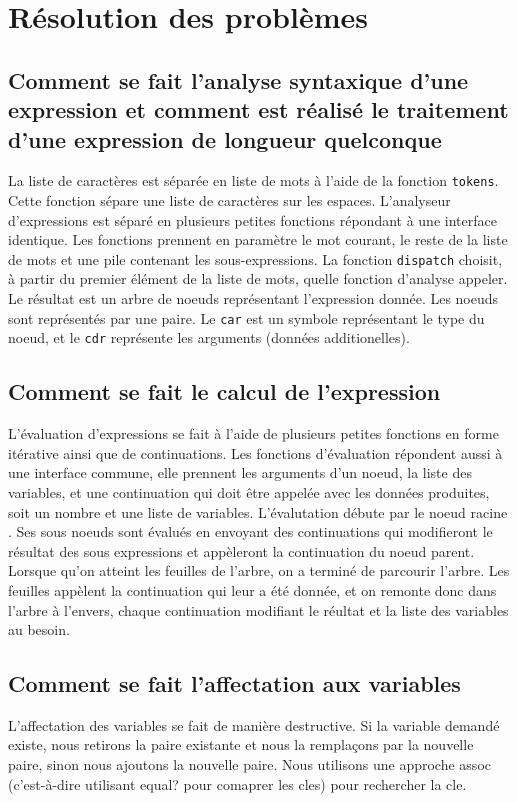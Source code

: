 \documentclass[a4paper,12pt,french]{article}
\begin{document}
	\section{Résolution des problèmes}
	\renewcommand{\thesubsection}{(\alph{subsection})}
	\subsection{Comment se fait l'analyse syntaxique d'une expression et comment est réalisé le traitement d'une expression de longueur quelconque}
	La liste de caractères est séparée en liste de mots à l'aide de la fonction \lstinline$tokens$. Cette fonction sépare une liste de caractères sur les espaces. L'analyseur d'expressions est séparé en plusieurs petites fonctions répondant à une interface identique. Les fonctions prennent en paramètre le mot courant, le reste de la liste de mots et une pile contenant les sous-expressions. La fonction \lstinline$dispatch$ choisit, à partir du premier élément de la liste de mots, quelle fonction d'analyse appeler. Le résultat est un arbre de noeuds représentant l'expression donnée. Les noeuds sont représentés par une paire. Le \lstinline$car$ est un symbole représentant le type du noeud, et le \lstinline$cdr$ représente les arguments (données additionelles).\\
	
	\subsection{Comment se fait le calcul de l'expression}
	L'évaluation d'expressions se fait à l'aide de plusieurs petites fonctions en forme itérative ainsi que de continuations. Les fonctions d'évaluation répondent aussi à une interface commune, elle prennent les arguments d'un noeud, la liste des variables, et une continuation qui doit être appelée avec les données produites, soit un nombre et une liste de variables. L'évalutation débute par le noeud \og racine \fg{}. Ses sous noeuds sont évalués en envoyant des continuations qui modifieront le résultat des sous expressions et appèleront la continuation du noeud parent. Lorsque qu'on atteint les feuilles de l'arbre, on a terminé de parcourir l'arbre. Les feuilles appèlent la continuation qui leur a été donnée, et on remonte donc dans l'arbre à l'envers, chaque continuation modifiant le réultat et la liste des variables au besoin.
	\subsection{Comment se fait l'affectation aux variables}
	L'affectation des variables se fait de manière destructive. Si la variable demandé existe, nous retirons la paire existante et nous la remplaçons par la nouvelle paire, sinon nous ajoutons la nouvelle paire. Nous utilisons une approche assoc (c'est-à-dire utilisant equal? pour comaprer les cles) pour rechercher la cle.
\end{document}

